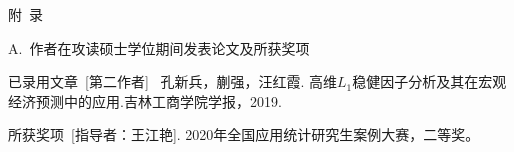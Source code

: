 \centerline{\large\heiti 附\ 录 }

\vspace{2ex}
{\heiti\large A.\ 作者在攻读硕士学位期间发表论文及所获奖项}

{\heiti 已录用文章\ [第二作者]} \ 孔新兵，蒯强，汪红霞. 高维$L_1$稳健因子分析及其在宏观经济预测中的应用.吉林工商学院学报，2019.

{\heiti 所获奖项\ [指导者：王江艳]}. 2020年全国应用统计研究生案例大赛，二等奖。
\thispagestyle{plain}
